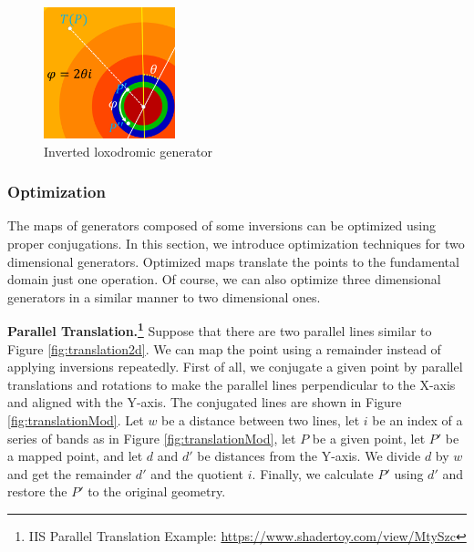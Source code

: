\begin{figure}[h!tbp]
\begin{minipage}[t]{0.24\hsize}
 \end{minipage}
  \hspace*{\fill}
 \begin{minipage}[t]{0.24\hsize}
   \begin{center}
    \includegraphics[width=1.5in, height=1.5in, keepaspectratio]{./img/application/optimization/loxodromicModRotation.pdf}
   \end{center}
   \caption{Inverted loxodromic generator}
   \label{fig:loxodromicRotationMod}
  \hspace*{\fill}
 \end{minipage}
\end{figure}


\subsubsection{Optimization}

 The maps of generators composed of some inversions
 can be optimized using proper conjugations.
 In this section, we introduce optimization techniques for two dimensional
 generators.
 Optimized maps translate the points to the fundamental domain just one operation.
 Of course, we can also optimize three dimensional generators in a similar manner to
 two dimensional ones.

 \noindent\textbf{Parallel Translation.\footnote{IIS Parallel Translation Example: \url{https://www.shadertoy.com/view/MtySzc}}}
 Suppose that there are two parallel lines similar to Figure
 \ref{fig:translation2d}.
 We can map the point using a remainder instead of applying inversions
 repeatedly.
 First of all, we conjugate a given point by parallel translations and rotations to make the
 parallel lines perpendicular to the X-axis and aligned with the Y-axis.
 The conjugated lines are shown in Figure \ref{fig:translationMod}.
 Let $w$ be a distance between two lines, let $i$ be an index of a series
 of bands as in Figure \ref{fig:translationMod}, let $P$ be a given point, let
 $P'$ be a mapped point, and let $d$ and $d'$ be distances from the Y-axis.
 We divide $d$ by $w$ and get the remainder $d'$ and the
 quotient $i$.
 Finally, we calculate $P'$ using $d'$ and restore the $P'$ to the
 original geometry.

